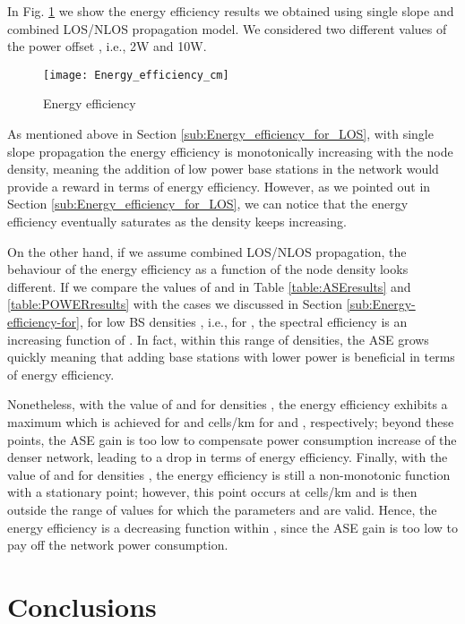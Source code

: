 \documentclass[twocoumn]{IEEEtran}
\begin{document}
In Fig. \ref{fig:energy_efficiency} we show the energy efficiency
results we obtained using single slope and combined LOS/NLOS propagation
model. We considered two different values of the power offset , i.e., 2W and 10W. 
\begin{figure}
\centering 
\texttt{[image: Energy\_efficiency\_cm]}
\caption{Energy efficiency}
\label{fig:energy_efficiency}
\vspace{-5mm}
\end{figure}
As mentioned above in Section \ref{sub:Energy_efficiency_for_LOS},
with single slope propagation the energy efficiency is monotonically
increasing with the node density, meaning the addition of low power
base stations in the network would provide a reward in terms of energy
efficiency. However, as we pointed out in Section \ref{sub:Energy_efficiency_for_LOS}, we can notice that the energy efficiency eventually saturates as the density keeps increasing. 

On the other hand, if we assume combined LOS/NLOS propagation, the
behaviour of the energy efficiency as a function of the node density
looks different. If we compare the values of  and  in Table \ref{table:ASEresults} and \ref{table:POWERresults} with the cases we discussed in Section \ref{sub:Energy-efficiency-for}, for low BS densities , i.e., for , the spectral efficiency is an increasing function of . In fact, within this range of densities, the ASE grows quickly meaning that adding base stations with lower power is beneficial in terms of energy efficiency. 

Nonetheless, with the value of  and  for densities , the energy efficiency exhibits a maximum which is achieved for  and  cells/km for  and , respectively; beyond these points, the ASE gain is too low to compensate power consumption increase of the denser network, leading to a drop in terms of energy efficiency. 
Finally, with the value of  and  for densities , the energy efficiency is still a non-monotonic function with a stationary point; however, this point occurs at  	cells/km and is then outside the range of values  for which the parameters  and  are valid. Hence, the energy efficiency is a decreasing function within , since the ASE gain is too low to pay off the network power consumption.
 

\section{Conclusions} \label{sec:conclusions}
\end{document}
